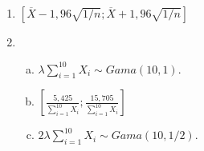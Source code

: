 \documentclass[10pt,brazil,addpoints]{exam}
\begin{document}
\begin{enumerate}[1.]
\medskip
\item $\left[\overline{X}-1,96\sqrt{1/n};  \overline{X}+1,96\sqrt{1/n}\right]$


\medskip
\item 
\begin{enumerate}[a)]
\item $\lambda\sum_{i=1}^{10} X_i \sim Gama(10,1)$.

\item $\left[\frac{5,425}{\sum_{i=1}^{10} X_i} ; \frac{15,705}{\sum_{i=1}^{10} X_i}\right]$

\item $2\lambda\sum_{i=1}^{10} X_i \sim Gama(10,1/2)$.
\end{enumerate}
%
%
%
%
% 
%
% 
% 
%
%



\end{enumerate}
\end{document}
